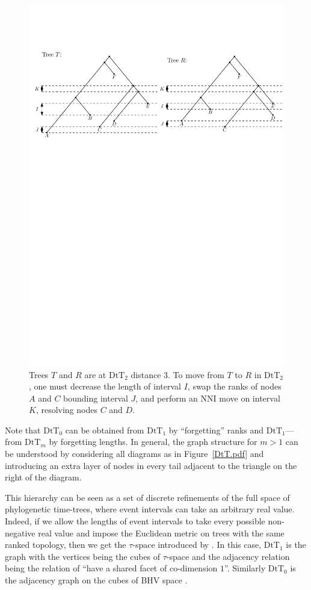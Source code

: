 \documentclass[11pt]{amsart}
\theoremstyle{definition}
\newcommand{\nni}{\mathrm{NNI}}
\newcommand{\dtt}{\mathrm{DtT}}
\begin{document}
\begin{figure}[ht]
\centering
\includegraphics[width=\textwidth]{dts_neighbors.pdf}
\caption{Trees $T$ and $R$ are at $\dtt_2$ distance $3$.
To move from $T$ to $R$ in $\dtt_2$, one must decrease the length of interval $I$, swap the ranks of nodes $A$ and $C$ bounding interval $J$, and perform an $\nni$ move on interval $K$, resolving nodes $C$ and $D$.}
\label{dts_neighbors.pdf}
\end{figure}

Note that $\dtt_0$ can be obtained from $\dtt_1$ by ``forgetting'' ranks and $\dtt_1$---from $\dtt_m$ by forgetting lengths.
In general, the graph structure for $m > 1$ can be understood by considering all diagrams as in Figure~\ref{DtT.pdf} and introducing an extra layer of nodes in every tail adjacent to the triangle on the right of the diagram.

This hierarchy can be seen as a set of discrete refinements of the full space of phylogenetic time-trees, where event intervals can take an arbitrary real value.
Indeed, if we allow the lengths of event intervals to take every possible non-negative real value and impose the Euclidean metric on trees with the same ranked topology, then we get the $\tau$-space introduced by \textcite{Gavryushkin2014-bw}.
In this case, $\dtt_1$ is the graph with the vertices being the cubes of $\tau$-space and the adjacency relation being the relation of ``have a shared facet of co-dimension $1$''.
Similarly $\dtt_0$ is the adjacency graph on the cubes of BHV space \autocite{Billera2001-rj}.
\end{document}
